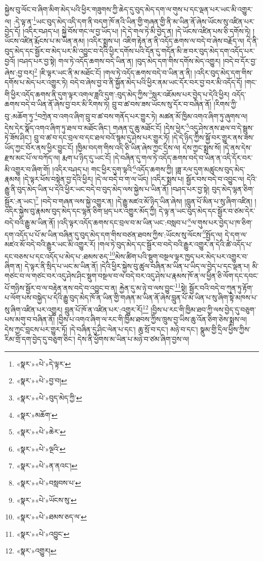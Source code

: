སྐྱེས་བུ་ལོང་བ་ཞིག་མིག་མེད་པའི་ཕྱིར་གཟུགས་ཀྱི་ཆེད་དུ་བུད་མེད་དག་ལ་གུས་པ་དང་ལྡན་པར་ཡང་མི་འགྱུར་ལ། :དེ་ལྟ་ན་\footnote{«སྣར་»«པེ་»དེ་ལྟར་}ཡང་བུད་མེད་འདི་དག་ནི་བདག་ཁོ་ནའི་ཡིན་གྱི་གཞན་གྱི་ནི་མ་ཡིན་ནོ་ཞེས་ཡོངས་སུ་འཛིན་པར་བྱེད་དོ། །འདིར་བཤད་པ། སྐྱེ་བོས་གང་ལ་བྱ་ཡོད་པ། །དེ་དེ་གལ་ཏེ་མི་བྱེད་ན། །དེ་ཡོངས་འཛིན་པས་ཅི་དགོས་ཏེ། །ཡོངས་འཛིན་རྨོངས་པ་མ་ཡིན་ནམ། །འདིར་སྨྲས་པ། འཇིག་རྟེན་ན་ནི་འདོད་ཆགས་ལ་བདེ་བ་ཞེས་བརྗོད་ལ། དེ་ནི་བུད་མེད་དང་སྦྱོར་བ་མེད་པར་མི་འབྱུང་བ་དེའི་ཕྱིར་དགོས་པའི་དོན་དུ་གདོན་མི་ཟ་བར་བུད་མེད་དག་འདོད་པར་བྱའོ། །བཤད་པར་བྱ་སྟེ། གལ་ཏེ་འདོད་ཆགས་བདེ་ཡིན་ན། །བུད་མེད་དག་གིས་དགོས་མེད་འགྱུར། །བདེ་བ་དོར་བྱ་ཞེས་:བྱ་བར།\footnote{«སྣར་»«པེ་»བྱ་བ།} །ཇི་ལྟར་ཡང་ནི་མ་མཐོང་ངོ། །གལ་ཏེ་འདོད་ཆགས་བདེ་བ་ཡིན་ན་ནི། །འདིར་བུད་མེད་དག་གིས་དགོས་པ་མེད་པར་འགྱུར་ཏེ། བདེ་བ་ཞེས་བྱ་བ་ནི་སྐྱོན་མེད་པའི་ཕྱིར་ནམ་ཡང་དོར་བར་བྱ་བར་མི་འདོད་དོ། །གང་གི་ཕྱིར་འདོད་ཆགས་ནི་དུག་ལྟར་འགལ་ཟླའི་དུག་:བུད་མེད་ཀྱིས་\footnote{«སྣར་»«པེ་»བུད་མེད་ཀྱི་}སླར་འཇོམས་པར་བྱེད་པ་དེའི་ཕྱིར། འདོད་ཆགས་བདེ་བ་ཡིན་ནོ་ཞེས་བྱ་བར་མི་རིགས་ཏེ། བྲུ་བ་ཚ་བས་ཟས་ཡོངས་སུ་དོར་བ་བཞིན་ནོ། །རིགས་ཀྱི་བུ་:མཆོག་ཏུ་\footnote{«སྣར་»མཆོག་}བཀྲེན་བ་འགའ་ཞིག་བྲུ་བ་ཚ་བས་གནོད་པར་གྱུར་ཏེ། མཚན་མོ་ཁྱིམ་འགའ་ཞིག་ཏུ་ཞུགས་ལ། དེས་དེར་སྣོད་འགའ་ཞིག་ཏུ་ཐལ་བ་མཐོང་ཞིང་། གཞན་དུ་ཆུ་མཐོང་ངོ། །དེས་ཕྱེར་\footnote{«སྣར་»«པེ་»ཆེར་}འདུ་ཤེས་ནས་ཐལ་བ་དེ་སྦྲུས་ཏེ་ཟོས་ཤིང་། བྲུ་བ་ཚ་བ་དང་བྲལ་བ་དང་ཐལ་བའོ་སྙམ་དུ་ཤེས་པར་གྱུར་ཏོ། །དེ་དེ་ཉིད་ཀྱིས་སྐྱོ་བར་གྱུར་ནས་ཟས་ཡོད་ཀྱང་བོར་ནས་ཕྱིར་བྱུང་ངོ། །ཁྱིམ་བདག་གིས་འདི་ཅི་ཡིན་ཞེས་ཀྱང་དྲིས་ལ། དེས་ཀྱང་སྨྲས་སོ། །དེ་ནས་དེས་རྫས་མང་པོ་ལ་བཀོད་ལ། རྨག་པ་ཉིད་དུ་ཡང་ངོ། །དེ་བཞིན་དུ་གལ་ཏེ་འདོད་ཆགས་བདེ་བ་ཡིན་ན་འདི་དོར་བར་མི་འགྱུར་བ་ཞིག་གོ། །འདིར་བཤད་པ། གང་ཕྱིར་དུག་ལྟའི་\footnote{«སྣར་»«པེ་»ལྔའི་}འདོད་ཆགས་ཀྱི། །ཟླ་རལ་དུག་མཚུངས་བུད་མེད་རྣམས། །དེ་ལྟར་ཕོས་བསྟེན་བྱ་དེའི་ཕྱིར། །དེ་ལ་བདེ་བ་ག་ལ་ཡོད། །འདིར་སྨྲས་པ། སྦྱོར་བས་བདེ་བ་འབྱུང་ལ། དེའི་རྒྱུ་ནི་བུད་མེད་ཡིན་པ་དེའི་ཕྱིར་ཡང་བདེ་བ་བུད་མེད་ལས་སྐྱེས་པ་ཡིན་ནོ། །བཤད་པར་བྱ་སྟེ། བུད་མེད་ལྷན་ཅིག་སྦྱོར་:ན་ཡང་།\footnote{«སྣར་»«པེ་»ན་ནའང་།} །བདེ་བ་གཞན་ལས་སྐྱེ་འགྱུར་ན། །དེ་རྒྱུ་མཛའ་མོ་ཉིད་ཡིན་ཞེས། །བླུན་པོ་མིན་པ་སུ་ཞིག་འཛིན། །འདིར་སྐྱེས་བུ་རྣམས་བུད་མེད་དང་ལྷན་ཅིག་ཕྲད་པར་འགྱུར་མོད་ཀྱི། དེ་ལྟ་ན་ཡང་བུད་མེད་དང་སྦྱོར་བ་ཙམ་དེར་བདེ་བའི་རྒྱུ་མ་ཡིན་ནོ། །འདི་ལྟར་འདོད་ཆགས་དང་བྲལ་བ་མ་ཡིན་ཡང་:བསླབ་པ་\footnote{«སྣར་»«པེ་»བསླབས་པ་}ལ་གུས་པར་བྱེད་པ་ཁ་ཅིག་དག་འདོད་པ་པོ་མ་ཡིན་བཞིན་དུ་བུད་མེད་དག་གིས་བཙན་ཐབས་ཀྱིས་:ཡོངས་སུ་ལོངས་\footnote{«སྣར་»«པེ་»ཡོངས་སུ་}སྤྱོད་ལ། དེ་དག་ལ་མཛའ་མོ་བདེ་བའི་རྒྱུར་ཡང་མི་འགྱུར་རོ། །གལ་ཏེ་བུད་མེད་དང་སྦྱོར་བ་བདེ་བའི་རྒྱུར་འགྱུར་ན་དེའི་ཚེ་འདོད་པ་དང་བཅས་པ་དང་འདོད་པ་མེད་པ་:ཐམས་ཅད་\footnote{«སྣར་»«པེ་»ཐམས་ཅད་ལ་}མེས་ཚིག་པའི་སྡུག་བསྔལ་ལྟར་ཁྱད་པར་མེད་པར་འགྱུར་བ་ཞིག་ན། དེ་ལྟར་ནི་སྲིད་པ་ཡང་མ་ཡིན་ནོ། །དེའི་ཕྱིར་སྐྱེས་བུ་ཚུལ་བཞིན་མ་ཡིན་པ་ཡིད་ལ་བྱེད་པ་དང་ལྡན་པ། མི་གཙང་བ་ལ་གཙང་བར་འདུ་ཤེས་ཤིང་སྡུག་བསྔལ་བ་ལ་བདེ་བར་འདུ་ཤེས་པ་རྣམས་ཁོ་ན་ལ་ཕྱིན་ཅི་ལོག་དང་དབང་པོ་གཉིས་སྦྱོར་བ་ལ་བརྟེན་ནས་བདེ་བ་འབྱུང་བ་ན། རྐྱེན་དུ་མ་ཉེ་བ་ལས་བྱུང་\footnote{«སྣར་»«པེ་»འབྱུང་}སྟེ། སྦྱོར་བའི་བདེ་བ་ཀུན་ཏུ་རྟོག་པ་ལོག་པས་བསྐྱེད་པ་དེའི་རྒྱུ་བུད་མེད་ཁོ་ན་ཡིན་གྱི་གཞན་མ་ཡིན་ནོ་ཞེས་བླུན་པོ་མ་ཡིན་པ་སུ་ཞིག་སྟེ་མཁས་པ་སུ་ཞིག་འཛིན་པར་འགྱུར། བླུན་པོ་ཁོ་ན་འཛིན་པར་:འགྱུར་རོ།\footnote{«སྣར་»འགྱུར།} །བྱིས་པ་རང་གི་ཁྱིམ་ཐབ་ཀྱི་ལས་བྱེད་དུ་བཅུག་པས་མགུ་བ་བཞིན་ནོ། །བྱིས་པ་འགའ་ཞིག་ལ་རང་གི་ཁྱིམ་ཐབས་ཀྱིས་ཁྲུས་བྱ་ཡིས་ཆུ་འོན་ཅིག་ཅེས་སྨྲས་ལ། དེས་ཀྱང་བླངས་པར་གྱུར་ཏོ། །དེ་བཞིན་དུ་ཤིང་ལེན་པ་དང་། ཆུ་སྲོ་བ་དང་། མཉེ་བ་དང་། སྣུམ་གྱི་དྲིལ་ཕྱིས་ཀྱིས་རིམ་གྲོ་དག་བྱེད་དུ་བཅུག་ཅིང་། དེས་ནི་ཕྱོགས་མ་ཡིན་པ་མཉེ་བ་ཙམ་ཞིག་བྱས་ལ། 